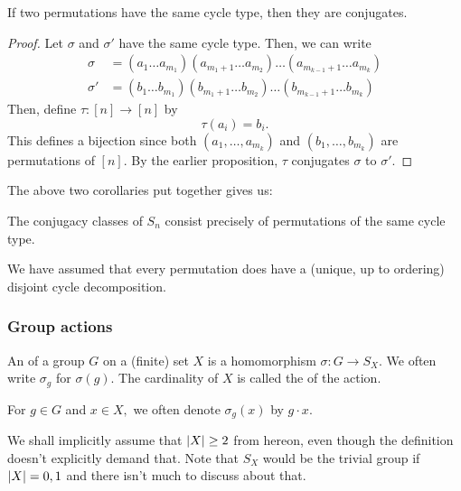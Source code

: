 \begin{cor}
	If two permutations have the same cycle type, then they are conjugates.
\end{cor}
\begin{proof} 
	Let $\sigma$ and $\sigma'$ have the same cycle type. Then, we can write
	\begin{align*} 
		\sigma &= (a_1 \ldots a_{m_1})(a_{m_1 + 1} \ldots a_{m_2})\ldots(a_{m_{k-1} + 1} \ldots a_{m_k})\\
		\sigma' &= (b_1 \ldots b_{m_1})(b_{m_1 + 1} \ldots b_{m_2})\ldots(b_{m_{k-1} + 1} \ldots b_{m_k})
	\end{align*}
	Then, define $\tau:[n] \to [n]$ by
	\begin{equation*} 
		\tau(a_i) = b_i.
	\end{equation*}
	This defines a bijection since both $(a_1, \ldots, a_{m_k})$ and $(b_1, \ldots, b_{m_k})$ are permutations of $[n].$ By the earlier proposition, $\tau$ conjugates $\sigma$ to $\sigma'.$
\end{proof}

The above two corollaries put together gives us:
\begin{thm} \label{thm:descconjclassSn}
	The conjugacy classes of $S_n$ consist precisely of permutations of the same cycle type.
\end{thm}

\begin{rem}
	We have assumed that every permutation does have a (unique, up to ordering) disjoint cycle decomposition.
\end{rem}

\subsubsection{Group actions} \label{subsubsec:groupactions}

\begin{defn}%
	An  of a group $G$ on a (finite) set $X$ is a homomorphism $\sigma : G \to S_X.$ We often write $\sigma_g$ for $\sigma(g).$ The cardinality of $X$ is called the  of the action.

	For $g \in G$ and $x \in X,$ we often denote $\sigma_g(x)$ by $g \cdot x.$ 
\end{defn}

\begin{rem}
	We shall implicitly assume that ${\left\lvert X \right\lvert} \ge 2$ from hereon, even though the definition doesn't explicitly demand that. Note that $S_X$ would be the trivial group if ${\left\lvert X \right\lvert} = 0, 1$ and there isn't much to discuss about that.
\end{rem}

